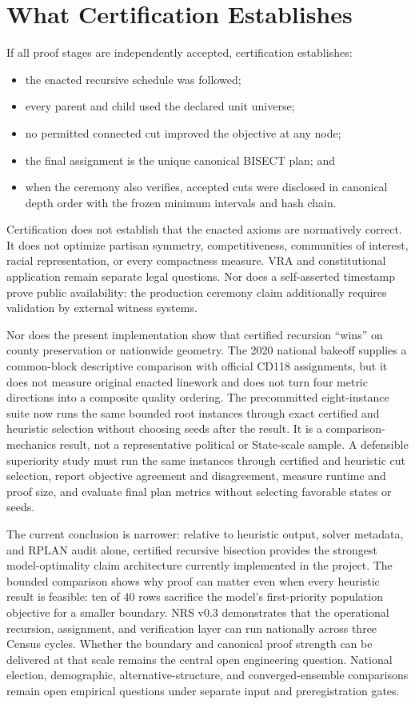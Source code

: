 \section{What Certification Establishes}

If all proof stages are independently accepted, certification establishes:
\begin{itemize}
  \item the enacted recursive schedule was followed;
  \item every parent and child used the declared unit universe;
  \item no permitted connected cut improved the objective at any node;
  \item the final assignment is the unique canonical BISECT plan; and
  \item when the ceremony also verifies, accepted cuts were disclosed in
  canonical depth order with the frozen minimum intervals and hash chain.
\end{itemize}

Certification does not establish that the enacted axioms are normatively
correct. It does not optimize partisan symmetry, competitiveness, communities
of interest, racial representation, or every compactness measure. VRA and
constitutional application remain separate legal questions.
Nor does a self-asserted timestamp prove public availability: the production
ceremony claim additionally requires validation by external witness systems.

Nor does the present implementation show that certified recursion ``wins'' on
county preservation or nationwide geometry. The 2020 national bakeoff supplies
a common-block descriptive comparison with official CD118 assignments, but it
does not measure original enacted linework and does not turn four metric
directions into a composite quality ordering. The precommitted eight-instance suite now runs the same
bounded root instances through exact certified and heuristic selection without
choosing seeds after the result. It is a comparison-mechanics result, not a
representative political or State-scale sample. A defensible superiority study
must run the same instances through certified and heuristic cut selection, report objective
agreement and disagreement, measure runtime and proof size, and evaluate final
plan metrics without selecting favorable states or seeds.

The current conclusion is narrower: relative to heuristic output, solver
metadata, and RPLAN audit alone, certified recursive bisection provides the
strongest model-optimality claim architecture currently implemented in the
project. The bounded comparison shows why proof can matter even when every
heuristic result is feasible: ten of 40 rows sacrifice the model's
first-priority population objective for a smaller boundary. NRS v0.3
demonstrates that the operational recursion, assignment, and
verification layer can run nationally across three Census cycles. Whether the
boundary and canonical proof strength can be delivered at that scale remains
the central open engineering question. National election, demographic,
alternative-structure, and converged-ensemble comparisons remain open empirical
questions under separate input and preregistration gates.

